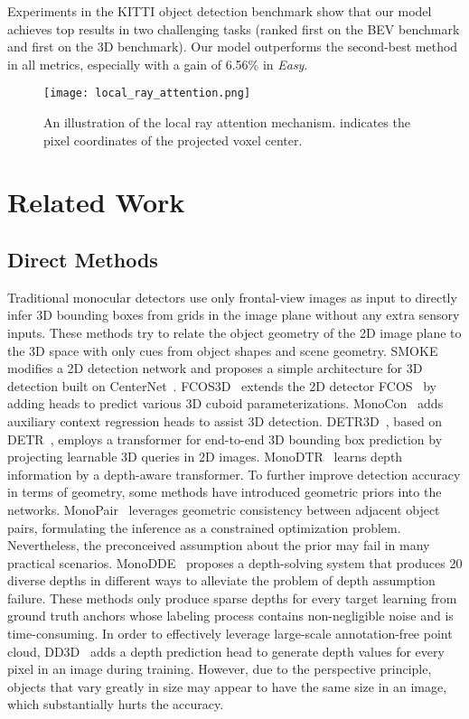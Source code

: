 \documentclass[10pt,twocolumn,letterpaper]{article}
\begin{document}
Experiments in the KITTI object detection benchmark show that our model achieves top results in two challenging tasks (ranked first on the BEV benchmark and first on the 3D benchmark). Our model outperforms the second-best method in all metrics, especially with a gain of 6.56\% in  {\it Easy}. 
\begin{figure*}
  \centering
  \texttt{[image: local\_ray\_attention.png]}
  \caption{An illustration of the local ray attention mechanism.  indicates the pixel coordinates of the projected voxel center.}
  \label{fig:local_ray_attention}
\end{figure*}

\section{Related Work}
\label{sec:related_work}
\subsection{Direct Methods}
Traditional monocular detectors use only frontal-view images as input to directly infer 3D bounding boxes from grids in the image plane without any extra sensory inputs. These methods try to relate the object geometry of the 2D image plane to the 3D space with only cues from object shapes and scene geometry. SMOKE~\cite{liu2020SMOKE} modifies a 2D detection network and proposes a simple architecture for 3D detection built on CenterNet~\cite{zhou2019objects}. FCOS3D~\cite{wang2021fcos3d} extends the 2D detector FCOS~\cite{tian2019fcos} by adding heads to predict various 3D cuboid parameterizations. MonoCon~\cite{Liu2021LearningAM} adds auxiliary context regression heads to assist 3D detection. DETR3D~\cite{detr3d}, based on DETR~\cite{carion2020end}, employs a transformer for end-to-end 3D bounding box prediction by projecting learnable 3D queries in 2D images. MonoDTR~\cite{Huang2022MonoDTRM3} learns depth information by a depth-aware transformer. To further improve detection accuracy in terms of geometry, some methods have introduced geometric priors into the networks. MonoPair~\cite{monopair} leverages geometric consistency between adjacent object pairs, formulating the inference as a constrained optimization problem. Nevertheless, the preconceived assumption about the prior may fail in many practical scenarios. MonoDDE~\cite{Li2022DiversityMF} proposes a depth-solving system that produces 20 diverse depths in different ways to alleviate the problem of depth assumption failure. These methods only produce sparse depths for every target learning from ground truth anchors whose labeling process contains non-negligible noise and is time-consuming. In order to effectively leverage large-scale annotation-free point cloud, DD3D~\cite{Park2021IsPN} adds a depth prediction head to generate depth values for every pixel in an image during training. However, due to the perspective principle, objects that vary greatly in size may appear to have the same size in an image, which substantially hurts the accuracy.
\end{document}
